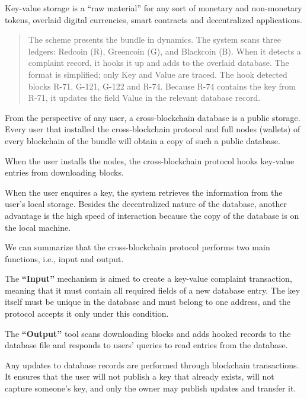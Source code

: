 \begin{multicols}{2}
{Key-value storage is a “raw material” for any sort of monetary and non-monetary tokens, overlaid digital currencies, smart contracts and decentralized applications.

\begin{quote}
The scheme presents the bundle in dynamics. The system scans three ledgers: Redcoin (R), Greencoin (G), and Blackcoin (B). When it detects a complaint record, it hooks it up and adds to the overlaid database. The format is simplified; only Key and Value are traced. The hook detected blocks R-71, G-121, G-122 and R-74. Because R-74 contains the key from R-71, it updates the field Value in the relevant database record. 
\end{quote}

From the perspective of any user, a cross-blockchain database is a public storage. Every user that installed the cross-blockchain protocol and full nodes (wallets) of every blockchain of the bundle will obtain a copy of such a public database.

When the user installs the nodes, the cross-blockchain protocol hooks key-value entries from downloading blocks.

When the user enquires a key, the system retrieves the information from the user’s local storage. Besides the decentralized nature of the database, another advantage is the high speed of interaction because the copy of the database is on the local machine.

We can summarize that the cross-blockchain protocol performs two main functions, i.e., input and output.

The \textbf{“Input”} mechanism is aimed to create a key-value complaint transaction, meaning that it must contain all required fields of a new database entry. The key itself must be unique in the database and must belong to one address, and the protocol accepts it only under this condition.

The \textbf{“Output”} tool scans downloading blocks and adds hooked records to the database file and responds to users’ queries to read entries from the database.

Any updates to database records are performed through blockchain transactions. It ensures that the user will not publish a key that already exists, will not capture someone’s key, and only the owner may publish updates and transfer it.

}
\end{multicols}

